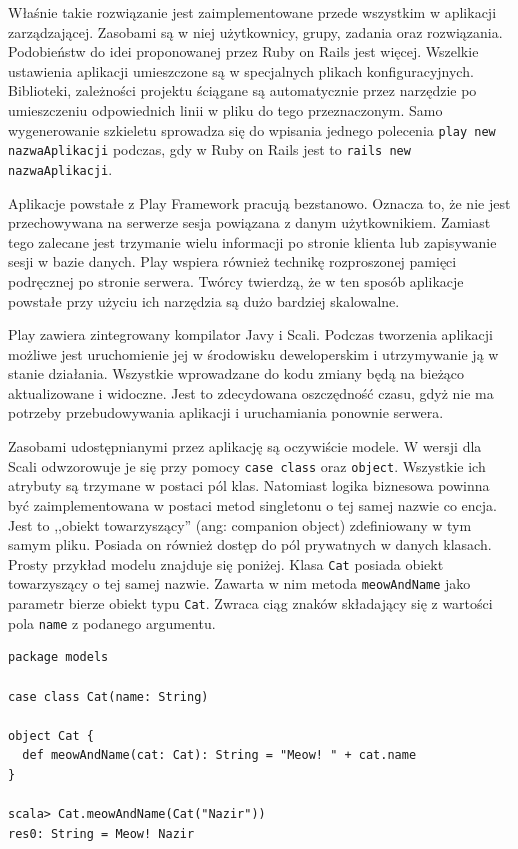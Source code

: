 \documentclass[brudnopis]{xmgr}
\begin{document}
Właśnie takie rozwiązanie jest zaimplementowane przede wszystkim w aplikacji zarządzającej. Zasobami są w niej użytkownicy, grupy, zadania oraz rozwiązania. Podobieństw do idei proponowanej przez Ruby on Rails jest więcej. Wszelkie ustawienia aplikacji umieszczone są w specjalnych plikach konfiguracyjnych. Biblioteki, zależności projektu ściągane są automatycznie przez narzędzie po umieszczeniu odpowiednich linii w pliku do tego przeznaczonym. Samo wygenerowanie szkieletu sprowadza się do wpisania jednego polecenia \texttt{play new nazwaAplikacji} podczas, gdy w Ruby on Rails jest to \texttt{rails new nazwaAplikacji}.

Aplikacje powstałe z Play Framework pracują bezstanowo. Oznacza to, że nie jest przechowywana na serwerze sesja powiązana z danym użytkownikiem. Zamiast tego zalecane jest trzymanie wielu informacji po stronie klienta lub zapisywanie sesji w bazie danych. Play wspiera również technikę rozproszonej pamięci podręcznej po stronie serwera. Twórcy twierdzą, że w ten sposób aplikacje powstałe przy użyciu ich narzędzia są dużo bardziej skalowalne.

Play zawiera zintegrowany kompilator Javy i Scali. Podczas tworzenia aplikacji możliwe jest uruchomienie jej w środowisku deweloperskim i utrzymywanie ją w stanie działania. Wszystkie wprowadzane do kodu zmiany będą na bieżąco aktualizowane i widoczne. Jest to zdecydowana oszczędność czasu, gdyż nie ma potrzeby przebudowywania aplikacji i uruchamiania ponownie serwera. 

Zasobami udostępnianymi przez aplikację są oczywiście modele. W wersji dla Scali odwzorowuje je się przy pomocy \texttt{case class} oraz \texttt{object}. Wszystkie ich atrybuty są trzymane w postaci pól klas. Natomiast logika biznesowa powinna być zaimplementowana w postaci metod singletonu o tej samej nazwie co encja. Jest to ,,obiekt towarzyszący'' (ang: companion object) zdefiniowany w tym samym pliku. Posiada on również dostęp do pól prywatnych w danych klasach. Prosty przykład modelu znajduje się poniżej. Klasa \texttt{Cat} posiada obiekt towarzyszący o tej samej nazwie. Zawarta w nim metoda \texttt{meowAndName} jako parametr bierze obiekt typu \texttt{Cat}. Zwraca ciąg znaków składający się z wartości pola \texttt{name} z podanego argumentu.

\begin{verbatim}
package models

case class Cat(name: String)

object Cat {
  def meowAndName(cat: Cat): String = "Meow! " + cat.name
}

scala> Cat.meowAndName(Cat("Nazir"))
res0: String = Meow! Nazir
\end{verbatim}
\end{document}
